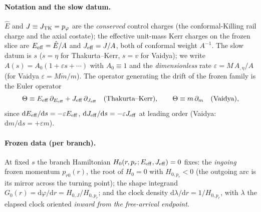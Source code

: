 \documentclass[12pt]{iopart}
\theoremstyle{plain}
\theoremstyle{definition}
\theoremstyle{remark}
\newcommand{\Ehat}{\hat E}
\newcommand{\dd}{\mathrm{d}}
\begin{document}
\paragraph{Notation and the slow datum.} $\Ehat$ and $J\equiv J_{\rm TK}=p_\varphi$ are
the \emph{conserved} control charges (the conformal-Killing rail charge and the axial costate); the effective
unit-mass Kerr charges on the frozen slice are $E_{\rm eff}=\Ehat/A$ and
$J_{\rm eff}=J/A$, both of conformal weight $A^{-1}$. The slow datum is $s$ ($s=\eta$ for
Thakurta--Kerr, $s=v$ for Vaidya); we write $A(s)=A_0(1+\varepsilon s+\cdots)$ with
$A_0\equiv1$ and the \emph{dimensionless} rate $\varepsilon=M\,A_{,\eta}/A$ (for Vaidya
$\varepsilon=M\dot m/m$). The operator generating the drift of the frozen family is the
Euler operator
\begin{equation}
    \Theta\equiv E_{\rm eff}\,\partial_{E_{\rm eff}}+J_{\rm eff}\,\partial_{J_{\rm eff}}
    \quad(\text{Thakurta--Kerr}),\qquad
    \Theta\equiv m\,\partial_m\quad(\text{Vaidya}),
    \label{eq:theta-op}
\end{equation}
since $\dd E_{\rm eff}/\dd s=-\varepsilon E_{\rm eff}$, $\dd J_{\rm eff}/\dd s=-\varepsilon
J_{\rm eff}$ at leading order (Vaidya: $\dd m/\dd s=+\varepsilon m$).

\paragraph{Frozen data (per branch).} At fixed $s$ the branch Hamiltonian
$H_0(r,p_r;E_{\rm eff},J_{\rm eff})=0$ fixes: the \emph{ingoing} frozen momentum
$p_{r0}(r)$, the root of $H_0=0$ with $H_{0,p_r}<0$ (the outgoing arc is its mirror
across the turning point); the shape integrand $G_0(r)=\dd\varphi/\dd r=H_{0,J}/H_{0,p_r}$;
and the clock density $\dd\lambda/\dd r=1/H_{0,p_r}$, with $\lambda$ the elapsed clock
oriented \emph{inward from the free-arrival endpoint}.
\end{document}
